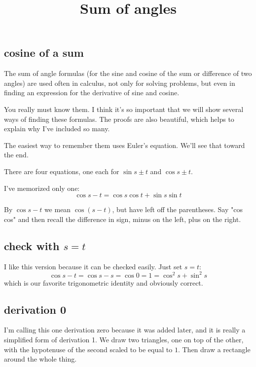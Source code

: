 \documentclass[11pt, oneside]{article}
\title{Sum of angles}
\date{}
\begin{document}
\maketitle
\Large


\label{sec:sum_angles_similar_tri}

\subsection*{cosine of a sum}

The sum of angle formulas (for the sine and cosine of the sum or difference of two angles) are used often in calculus, not only for solving problems, but even in finding an expression for the derivative of sine and cosine.

You really must know them.  I think it's so important that we will show several ways of finding these formulas.  The proofs are also beautiful, which helps to explain why I've included so many.

The easiest way to remember them uses Euler's equation.  We'll see that toward the end.

There are four equations, one each for $\sin s \pm t$ and $\cos s \pm t$.

I've memorized only one:
\[ \cos s - t = \cos s \cos t + \sin s \sin t \]

By $\cos s - t$ we mean $\cos (s - t)$, but have left off the parentheses.  Say "cos cos" and then recall the difference in sign, minus on the left, plus on the right.

\subsection*{check with $s = t$}

I like this version because it can be checked easily.  Just set $s = t$:
\[ \cos s - t = \cos s - s = \cos 0 = 1 = \cos^2 s + \sin^2 s \]
which is our favorite trigonometric identity and obviously correct.

\subsection*{derivation 0}
I'm calling this one derivation zero because it was added later, and it is really a simplified form of derivation 1.  We draw two triangles, one on top of the other, with the hypotenuse of the second scaled to be equal to $1$.  Then draw a rectangle around the whole thing.
\end{document}
